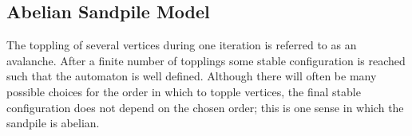 \documentclass{article}
\begin{document}
    \subsection{Abelian Sandpile Model}
    The toppling of several vertices during one iteration is referred to as an avalanche. After a finite number of topplings some stable configuration is reached such that the automaton is well defined. Although there will often be many possible choices for the order in which to topple vertices, the final stable configuration does not depend on the chosen order; this is one sense in which the sandpile is abelian.
    
    
    
    
    
    
    
    

    
    
    
    
\end{document}
